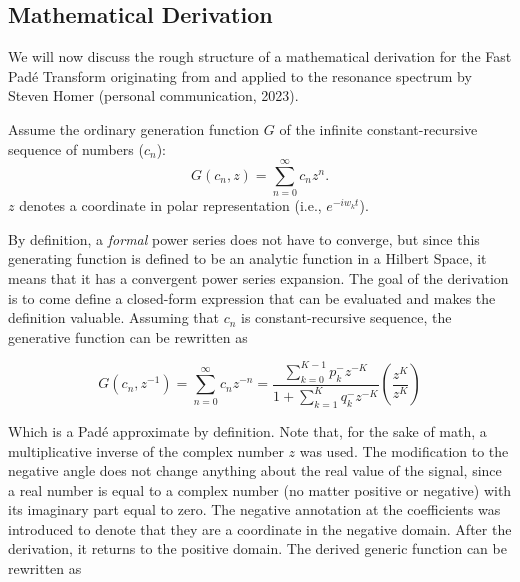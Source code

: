 



\subsection{Mathematical Derivation}
We will now discuss the rough structure of a mathematical derivation for the Fast Padé Transform originating from \textcite{belkic_signal_2019} and applied to the resonance spectrum by Steven Homer (personal communication, 2023).

Assume the ordinary generation function $G$ of the infinite constant-recursive sequence of numbers ($c_n$):
\begin{equation}
	G(c_n,z) = \sum_{n=0}^\infty c_n z^{n}.
\end{equation}
$z$ denotes a coordinate in polar representation (i.e., $e^{-iw_kt}$). 

By definition, a \textit{formal} power series does not have to converge, but since this generating function is defined to be an analytic function in a Hilbert Space, it means that it has a convergent power series expansion. The goal of the derivation is to come define a closed-form expression that can be evaluated and makes the definition valuable. Assuming that $c_n$ is constant-recursive sequence, the generative function can be rewritten as 

\begin{equation}
	G(c_n,z^{-1}) = \sum^\infty_{n=0} c_n z^{-n} =\frac{\sum\limits_{k=0}^{K-1}p^-_kz^{-K}}{1+\sum\limits_{k=1}^{K}q^-_kz^{-K}} \left( \frac{z^K}{z^K} \right)
\end{equation}

Which is a Padé approximate by definition. Note that, for the sake of math, a multiplicative inverse of the complex number $z$ was used. The modification to the negative angle does not change anything about the real value of the signal, since a real number is equal to a complex number (no matter positive or negative) with its imaginary part equal to zero. The negative annotation at the coefficients was introduced to denote that they are a coordinate in the negative domain. After the derivation, it returns to the positive domain. The derived generic function can be rewritten as




